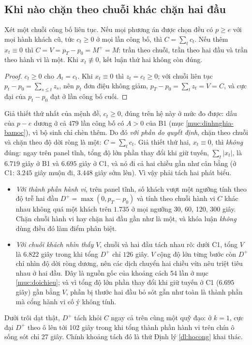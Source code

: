 \subsection{Khi nào chặn theo chuỗi khác chặn hai đầu}
\label{muc:dondieu}

\begin{menhde}
\label{md:dondieu}
Xét một chuỗi công bố liên tục. Nếu mọi phương án được chọn đều có $p \ge e$ với mọi hành khách
cũ, tức $c_t \ge 0$ ở mọi lần công bố, thì $C = \sum_t c_t$. Nếu thêm $x_t \equiv 0$ thì
$C = V = p_T - p_0 = M^{+} = M$: trần theo chuỗi, trần theo hai đầu và trần theo hành vi là một.
Khi $x_t \not\equiv 0$, kết luận thứ hai không còn đúng.
\end{menhde}

\begin{proof}
$c_t \ge 0$ cho $A_t = c_t$. Khi $x_t \equiv 0$ thì $z_t = c_t \ge 0$; với chuỗi liên tục
$p_t - p_0 = \sum_{s \le t} z_s$, nên $p_t$ đơn điệu không giảm, $p_T - p_0 = \sum_t z_t = V = C$,
và cực đại của $p_t - p_0$ đạt ở lần công bố cuối.
\end{proof}

Giả thiết thứ nhất của mệnh đề, $c_t \ge 0$, đúng trên hệ này ở mức đo được: dấu của $p - e$ dương
ở cả $479$ lần công bố có $A > 0$ của B1 (mục \ref{muc:dinhnghia-bamoc}), vì bộ sinh chỉ chèn thêm.
Do đó \emph{với phần do quyết định}, chặn theo chuỗi và chặn theo độ dời ròng là một: $C = \sum_t c_t$.
Giả thiết thứ hai, $x_t \equiv 0$, thì \emph{không} đúng: ngay trên panel tĩnh, tổng độ lớn phần
thay đổi khi giữ tuyến, $\sum_t |x_t|$, là $6.719$ giây ở B1 và $6.695$ giây ở C1, và nó đi cả hai
chiều gần như cân bằng (ở C1: $3.245$ giây muộn đi, $3.448$ giây sớm lên). Vì vậy phải tách hai
phát biểu.
\begin{itemize}[leftmargin=1.2cm,itemsep=2pt,topsep=3pt]
\item \emph{Với thành phần hành vi}, trên panel tĩnh, số khách vượt một ngưỡng tính theo độ trễ hai
đầu $D^{+} = \max(0, p_T - p_0)$ và tính theo chuỗi hành vi $C$ khác nhau không quá một khách trên
$1.735$ ở mọi ngưỡng 30, 60, 120, 300 giây. Chặn chuỗi hành vi hay chặn hai đầu gần như là một, và
khóa luận \emph{không} dùng điều đó làm điểm phân biệt.
\item \emph{Với chuỗi khách nhìn thấy} $V$, chuỗi và hai đầu tách nhau rõ: dưới C1, tổng $V$ là
$6.822$ giây trong khi tổng $D^{+}$ chỉ $126$ giây. $V$ cộng độ lớn từng bước còn $D^{+}$ chỉ nhìn
độ dời ròng dương, nên các dịch chuyển hai chiều vừa nêu triệt tiêu nhau ở hai đầu. Đây là nguồn
gốc của khoảng cách 54 lần ở mục
\ref{muc:doichieu}; và vì tổng độ lớn phần thay đổi khi giữ tuyến ở C1 ($6.695$ giây) gần bằng
$V$, phần bị thước hai đầu bỏ sót gần như toàn là thành phần mà cổng hành vi cố ý không tính.
\end{itemize}
Dưới trôi dạt thật, $D^{+}$ tách khỏi $C$ ngay cả trên cùng một quỹ đạo: ở $k = 1$, cực đại $D^{+}$
theo ô lên tới 102 giây trong khi tổng thành phần hành vi trên chín ô sống sót chỉ 27 giây. Chính
khoảng tách đó là thứ Định lý \ref{dl:hocong} khai thác.


